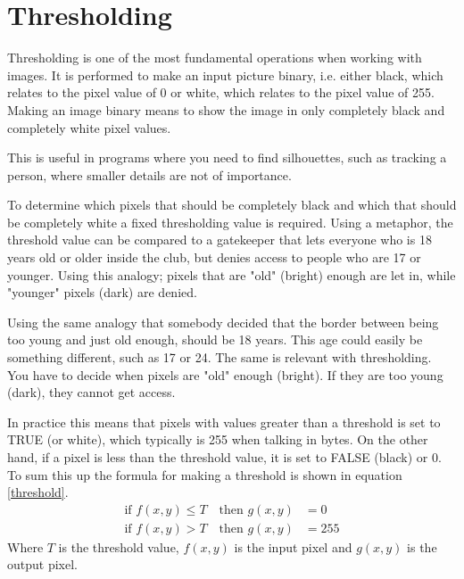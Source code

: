 \section{Thresholding}\label{sec:Thresholding}
Thresholding is one of the most fundamental operations when working with images. It is performed to make an input picture binary, i.e. either black, which relates to the pixel value of 0 or white, which relates to the pixel value of 255. Making an image binary means to show the image in only completely black and completely white pixel values.

This is useful in programs where you need to find silhouettes, such as tracking a person, where smaller details are not of importance.

To determine which pixels that should be completely black and which that should be completely white a fixed thresholding value is required. Using a metaphor, the threshold value can be compared to a gatekeeper that lets everyone who is 18 years old or older inside the club, but denies access to people who are 17 or younger. Using this analogy; pixels that are "old" (bright) enough are let in, while "younger" pixels (dark) are denied.

Using the same analogy that somebody decided that the border between being too young and just old enough, should be 18 years. This age could easily be something different, such as 17 or 24. The same is relevant with thresholding. You have to decide when pixels are "old" enough (bright). If they are too young (dark), they cannot get access.

In practice this means that pixels with values greater than a threshold is set to TRUE (or white), which typically is 255 when talking in bytes. On the other hand, if a pixel is less than the threshold value, it is set to FALSE (black) or 0. To sum this up the formula for making a threshold is shown in equation \ref{threshold}.
\begin{equation}
  \begin{aligned}
  	\text{if } f(x,y)\leq T \quad \text{then } g(x,y)&= 0 \\
  	\text{if } f(x,y)>T \quad \text{then } g(x,y)&= 255
	\label{threshold}  
  \end{aligned} 
\end{equation}
Where $T$ is the threshold value, $f(x,y)$ is the input pixel and $g(x,y)$ is the output pixel. 

